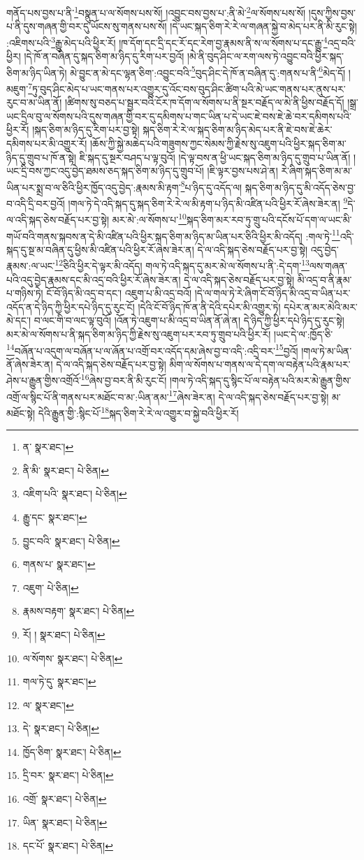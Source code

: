 གནོད་པས་བྱས་པ་ནི་\footnote{ན་  སྣར་ཐང་། }བསྣུན་པ་ལ་སོགས་པས་སོ། །འབྱུང་བས་བྱས་པ་:ནི་མེ་\footnote{ནི་མི་  སྣར་ཐང་།  པེ་ཅིན། }ལ་སོགས་པས་སོ། །དུས་ཀྱིས་བྱས་པ་ནི་དུས་གཞན་གྱི་བར་དུ་ཡོངས་སུ་གནས་པས་སོ། །དེ་ཡང་སྐད་ཅིག་རེ་རེ་ལ་གཞན་སྐྱེ་བ་མེད་པར་ནི་མི་རུང་སྟེ། :འཇིགས་པའི་\footnote{འཇིག་པའི་  སྣར་ཐང་།  པེ་ཅིན། }རྒྱུ་མེད་པའི་ཕྱིར་རོ། །ཁ་དོག་དང་དྲི་དང་རོ་དང་རེག་བྱ་རྣམས་ནི་ས་ལ་སོགས་པ་དང་རྒྱུ་\footnote{རྒྱུ་དང་  སྣར་ཐང་། }འདྲ་བའི་ཕྱིར། །དེ་ཁོ་ན་བཞིན་དུ་སྐད་ཅིག་མ་ཉིད་དུ་རིག་པར་བྱའོ། །མེ་ནི་བུད་ཤིང་ལ་རག་ལས་ཏེ་འབྱུང་བའི་ཕྱིར་སྐད་ཅིག་མ་ཉིད་ཡིན་ཏེ། མེ་བྱུང་ན་མེ་དང་ལྷན་ཅིག་:འབྱུང་བའི་\footnote{བྱུང་བའི་  སྣར་ཐང་།  པེ་ཅིན། }བུད་ཤིང་དེ་ཁོ་ན་བཞིན་དུ་:གནས་པ་ནི་\footnote{གནས་པ་  སྣར་ཐང་། }མེད་དོ། །མཇུག་\footnote{འཇུག་  པེ་ཅིན། }ཏུ་བུད་ཤིང་མེད་པ་ཡང་གནས་པར་འགྱུར་དུ་འོང་བས་བུད་ཤིང་ཚིག་པའི་མེ་ཡང་གནས་པར་ནུས་པར་རུང་བ་མ་ཡིན་ནོ། །ཚིགས་སུ་བཅད་པ་སྦྱར་བའི་ངོར་ཁ་དོག་ལ་སོགས་པ་ནི་སྔར་བརྗོད་ལ་མེ་ནི་ཕྱིས་བརྗོད་དོ། །སྒྲ་ཡང་དྲིལ་བུ་ལ་སོགས་པའི་དུས་གཞན་གྱི་བར་དུ་དམིགས་པ་གང་ཡིན་པ་དེ་ཡང་ཇེ་བས་ཇེ་ཆེ་བར་དམིགས་པའི་ཕྱིར་རོ། །སྐད་ཅིག་མ་ཉིད་དུ་རིག་པར་བྱ་སྟེ། སྐད་ཅིག་རེ་རེ་ལ་སྐད་ཅིག་མ་ཉིད་མེད་པར་ནི་ཇེ་བས་ཇེ་ཆེར་དམིགས་པར་མི་འགྱུར་རོ། །ཆོས་ཀྱི་སྐྱེ་མཆེད་པའི་གཟུགས་ཀྱང་སེམས་ཀྱི་རྗེས་སུ་འཇུག་པའི་ཕྱིར་སྐད་ཅིག་མ་ཉིད་དུ་གྲུབ་པ་ཁོ་ན་སྟེ། ཇི་སྐད་དུ་སྔར་བཤད་པ་ལྟ་བུའོ། །དེ་ལྟ་བས་ན་ཕྱི་ཡང་སྐད་ཅིག་མ་ཉིད་དུ་གྲུབ་པ་ཡིན་ནོ། །ཡང་དྲི་བས་ཀྱང་འདུ་བྱེད་ཐམས་ཅད་སྐད་ཅིག་མ་ཉིད་དུ་གྲུབ་པོ། །ཇི་ལྟར་བྱས་པས་ཤེ་ན། རེ་ཞིག་སྐད་ཅིག་མ་མ་ཡིན་པར་སྨྲ་བ་ལ་ཅིའི་ཕྱིར་ཁྱོད་འདུ་བྱེད་:རྣམས་མི་རྟག་\footnote{རྣམས་བརྟག་  སྣར་ཐང་།  པེ་ཅིན། }པ་ཉིད་དུ་འདོད་ལ། སྐད་ཅིག་མ་ཉིད་དུ་མི་འདོད་ཅེས་བྱ་བ་འདི་དྲི་བར་བྱའོ། །གལ་ཏེ་དེ་འདི་སྐད་དུ་སྐད་ཅིག་རེ་རེ་ལ་མི་རྟག་པ་ཉིད་མི་འཛིན་པའི་ཕྱིར་རོ་ཞེས་ཟེར་ན། \footnote{རོ། །   སྣར་ཐང་།  པེ་ཅིན། }དེ་ལ་འདི་སྐད་ཅེས་བརྗོད་པར་བྱ་སྟེ། མར་མེ་:ལ་སོགས་པ་\footnote{ལ་སོགས་  སྣར་ཐང་།  པེ་ཅིན། }སྐད་ཅིག་མར་རབ་ཏུ་གྲུ་པའི་དངོས་པོ་དག་ལ་ཡང་མི་གཡོ་བའི་གནས་སྐབས་ན་དེ་མི་འཛིན་པའི་ཕྱིར་སྐད་ཅིག་མ་ཉིད་མ་ཡིན་པར་ཅིའི་ཕྱིར་མི་འདོད། :གལ་ཏེ་\footnote{གལ་ཏེ་དུ་  སྣར་ཐང་། }འདི་སྐད་དུ་སྔ་མ་བཞིན་དུ་ཕྱིས་མི་འཛིན་པའི་ཕྱིར་རོ་ཞེས་ཟེར་ན། དེ་ལ་འདི་སྐད་ཅེས་བརྗོད་པར་བྱ་སྟེ། འདུ་བྱེད་རྣམས་:ལ་ཡང་\footnote{ལ་  སྣར་ཐང་། }ཅིའི་ཕྱིར་དེ་ལྟར་མི་འདོད། གལ་ཏེ་འདི་སྐད་དུ་མར་མེ་ལ་སོགས་པ་ནི་:དེ་དག་\footnote{དེ་  སྣར་ཐང་།  པེ་ཅིན། }ལས་གཞན་པའི་འདུ་བྱེད་རྣམས་དང་མི་འདྲ་བའི་ཕྱིར་རོ་ཞེས་ཟེར་ན། དེ་ལ་འདི་སྐད་ཅེས་བརྗོད་པར་བྱ་སྟེ། མི་འདྲ་བ་ནི་རྣམ་པ་གཉིས་ཏེ། ངོ་བོ་ཉིད་མི་འདྲ་བ་དང་། འཇུག་པ་མི་འདྲ་བའོ། །དེ་ལ་གལ་ཏེ་རེ་ཞིག་ངོ་བོ་ཉིད་མི་འདྲ་བ་ཡིན་པར་འདོད་ན་དེ་ཉིད་ཀྱི་ཕྱིར་དཔེ་ཉིད་དུ་རུང་ངོ། །དེའི་ངོ་བོ་ཉིད་ཁོ་ན་ནི་དེའི་དཔེར་མི་འགྱུར་ཏེ། དཔེར་ན་མར་མེའི་མར་མེ་དང་། བ་ལང་གི་བ་ལང་ལྟ་བུའོ། །འོན་ཏེ་འཇུག་པ་མི་འདྲ་བ་ཡིན་ནོ་ཞེ་ན། དེ་ཉིད་ཀྱི་ཕྱིར་དཔེ་ཉིད་དུ་རུང་སྟེ། མར་མེ་ལ་སོགས་པ་ནི་སྐད་ཅིག་མ་ཉིད་ཀྱི་རྗེས་སུ་འཇུག་པར་རབ་ཏུ་གྲུབ་པའི་ཕྱིར་རོ། །ཡང་དེ་ལ་:ཁྱོད་ཅི་\footnote{ཁྱོད་ཅིག་  སྣར་ཐང་།  པེ་ཅིན། }བཞོན་པ་འདུག་ལ་བཞོན་པ་ལ་ཞོན་པ་འགྲོ་བར་འདོད་དམ་ཞེས་བྱ་བ་འདི་:འདྲི་བར་\footnote{དྲི་བར་  སྣར་ཐང་།  པེ་ཅིན། }བྱའོ། །གལ་ཏེ་མ་ཡིན་ནོ་ཞེས་ཟེར་ན། དེ་ལ་འདི་སྐད་ཅེས་བརྗོད་པར་བྱ་སྟེ། མིག་ལ་སོགས་པ་གནས་ལ་དེ་དག་ལ་བརྟེན་པའི་རྣམ་པར་ཤེས་པ་རྒྱུན་གྱིས་འགྲོའོ་\footnote{འགྲོ་  སྣར་ཐང་།  པེ་ཅིན། }ཞེས་བྱ་བར་ནི་མི་རུང་ངོ། །གལ་ཏེ་འདི་སྐད་དུ་སྙིང་པོ་ལ་བརྟེན་པའི་མར་མེ་རྒྱུན་གྱིས་འགྲོ་ལ་སྙིང་པོ་ནི་གནས་པར་མཐོང་བ་མ་:ཡིན་ནམ་\footnote{ཡིན་  སྣར་ཐང་།  པེ་ཅིན། }ཞེས་ཟེར་ན། དེ་ལ་འདི་སྐད་ཅེས་བརྗོད་པར་བྱ་སྟེ། མ་མཐོང་སྟེ། དེའི་རྒྱུན་གྱི་:སྙིང་པོ་\footnote{དང་པོ་  སྣར་ཐང་།  པེ་ཅིན། }སྐད་ཅིག་རེ་རེ་ལ་འགྱུར་བ་སྐྱེ་བའི་ཕྱིར་རོ། 